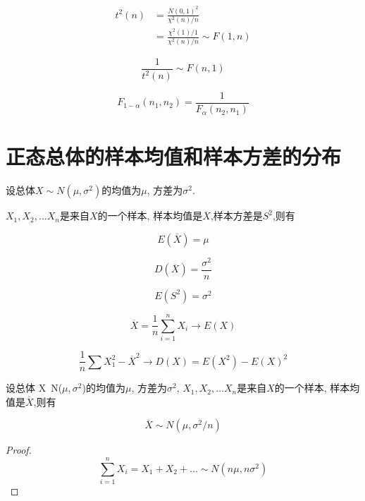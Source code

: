 \begin{corollary}[与 t 分布的关系]
    $$
        \begin{aligned}
            t^2(n) & = \frac{N(0,1)^2}{\chi^2 (n)/n}                    \\
                   & = \frac{\chi ^2(1)/1}{ \chi ^2(n) / n} \sim F(1,n)
        \end{aligned}
    $$

    $$
        \frac{1}{t^2(n)} \sim F(n,1)
    $$
\end{corollary}

\begin{corollary}
    $$
        F_{1-\alpha} (n_1,n_2) = \frac{1}{F_\alpha(n_2,n_1)}
    $$
\end{corollary}

\section{正态总体的样本均值和样本方差的分布}

\begin{definition}
    设总体$X\sim N(\mu,\sigma^2)$的均值为$\mu$, 方差为$σ^2$.

    $X_1,X_2,...X_n$是来自$X$的一个样本, 样本均值是$\overline{X}$,样本方差是$S^2$,则有

    $$
        E(\overline{X}) = { \mu}
    $$

    $$
        D(\overline{ X}) =  {\frac{\sigma^2}{n}}
    $$

    $$
        E(S^2) = { \sigma^2}
    $$
\end{definition}

\begin{corollary}[矩估计法原理]
    $$\overline{X}=\frac{1}{n} \sum_{i=1}^{n} X_{i} \to E(X)$$

    $$\frac{1}{n} \sum X_1^2 - \overline{X}^2 \to D(X) = E(X^2) - E(X)^2$$
\end{corollary}

\begin{theorem}[样本均值的分布]
    设总体 X~N($\mu,\sigma^2$)的均值为$\mu$, 方差为$σ^2$, $X_1,X_2,...X_n$是来自$X$的一个样本, 样本均值是$\overline{X}$,则有

    $$
        {\overline{X} \sim N(\mu,\sigma^2/n) }
    $$
\end{theorem}

\begin{proof}
    $$
        \sum^n_{i=1} X_i = X_1 + X_2 + ...\sim N(n\mu, n\sigma^2)
    $$
\end{proof}

